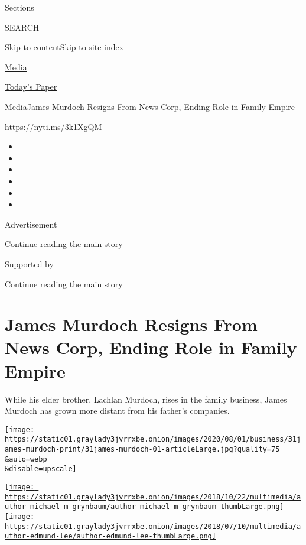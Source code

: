 Sections

SEARCH

\protect\hyperlink{site-content}{Skip to
content}\protect\hyperlink{site-index}{Skip to site index}

\href{https://www.nytimes3xbfgragh.onion/section/business/media}{Media}

\href{https://myaccount.nytimes3xbfgragh.onion/auth/login?response_type=cookie\&client_id=vi}{}

\href{https://www.nytimes3xbfgragh.onion/section/todayspaper}{Today's
Paper}

\href{/section/business/media}{Media}\textbar{}James Murdoch Resigns
From News Corp, Ending Role in Family Empire

\url{https://nyti.ms/3k1XgQM}

\begin{itemize}
\item
\item
\item
\item
\item
\item
\end{itemize}

Advertisement

\protect\hyperlink{after-top}{Continue reading the main story}

Supported by

\protect\hyperlink{after-sponsor}{Continue reading the main story}

\hypertarget{james-murdoch-resigns-from-news-corp-ending-role-in-family-empire}{%
\section{James Murdoch Resigns From News Corp, Ending Role in Family
Empire}\label{james-murdoch-resigns-from-news-corp-ending-role-in-family-empire}}

While his elder brother, Lachlan Murdoch, rises in the family business,
James Murdoch has grown more distant from his father's companies.

\texttt{[image: https://static01.graylady3jvrrxbe.onion/images/2020/08/01/business/31james-murdoch-print/31james-murdoch-01-articleLarge.jpg?quality=75\\\&auto=webp\\\&disable=upscale]}

\href{https://www.nytimes3xbfgragh.onion/by/michael-m-grynbaum}{\texttt{[image: https://static01.graylady3jvrrxbe.onion/images/2018/10/22/multimedia/author-michael-m-grynbaum/author-michael-m-grynbaum-thumbLarge.png]}}\href{https://www.nytimes3xbfgragh.onion/by/edmund-lee}{\texttt{[image: https://static01.graylady3jvrrxbe.onion/images/2018/07/10/multimedia/author-edmund-lee/author-edmund-lee-thumbLarge.png]}}

